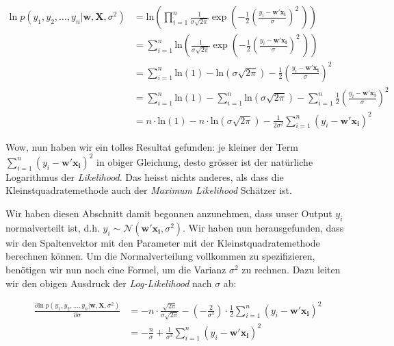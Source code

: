 \documentclass[
]{book}
\begin{document}
\begin{align}
\text{ln}\; p(y_1,y_2,\dots,y_n|\mathbf{w},\mathbf{X},\sigma^2) &= \text{ln}\left(\prod_{i=1}^n \frac{1}{\sigma\sqrt{2\pi}} \exp\left( -\frac{1}{2}\left(\frac{y_i - \mathbf{w}' \mathbf{x_i}}{\sigma}\right)^{\!2}\,\right)\right) \\
&= \sum_{i=1}^n \text{ln}\left(\frac{1}{\sigma\sqrt{2\pi}} \exp\left( -\frac{1}{2}\left(\frac{y_i - \mathbf{w}' \mathbf{x_i}}{\sigma}\right)^{\!2}\,\right) \right) \\
&= \sum_{i=1}^n \text{ln}\left(1\right) - \text{ln}\left(\sigma\sqrt{2\pi}\right) - \frac{1}{2}\left(\frac{y_i - \mathbf{w}' \mathbf{x_i}}{\sigma}\right)^{\!2} \\
&= \sum_{i=1}^n \text{ln}\left(1\right) - \sum_{i=1}^n \text{ln}\left(\sigma\sqrt{2\pi}\right) - \sum_{i=1}^n \frac{1}{2}\left(\frac{y_i - \mathbf{w}' \mathbf{x_i}}{\sigma}\right)^{\!2} \\
&= n \cdot \text{ln}\left(1\right) - n \cdot \text{ln}\left(\sigma\sqrt{2\pi}\right) - \frac{1}{2\sigma^2} \sum_{i=1}^n \left(y_i - \mathbf{w}' \mathbf{x_i}\right)^{\!2}
\end{align}

Wow, nun haben wir ein tolles Resultat gefunden: je kleiner der Term \(\sum_{i=1}^n \left(y_i - \mathbf{w}' \mathbf{x_i}\right)^{\!2}\) in obiger Gleichung, desto grösser ist der natürliche Logarithmus der \emph{Likelihood}. Das heisst nichts anderes, als dass die Kleinstquadratemethode auch der \emph{Maximum Likelihood} Schätzer ist.

Wir haben diesen Abschnitt damit begonnen anzunehmen, dass unser Output \(y_i\) normalverteilt ist, d.h. \(y_i \sim \mathcal{N}\left(\mathbf{w}' \mathbf{x_i}, \sigma^2\right)\). Wir haben nun herausgefunden, dass wir den Spaltenvektor mit den Parameter mit der Kleinstquadratemethode berechnen können. Um die Normalverteilung vollkommen zu spezifizieren, benötigen wir nun noch eine Formel, um die Varianz \(\sigma^2\) zu rechnen. Dazu leiten wir den obigen Ausdruck der \emph{Log-Likelihood} nach \(\sigma\) ab:

\begin{align}
\frac{\partial \text{ln}\; p(y_1,y_2,\dots,y_n|\mathbf{w},\mathbf{X},\sigma^2)}{\partial \sigma} &= -n\cdot \frac{\sqrt{2\pi}}{\sigma\sqrt{2\pi}} - (-\frac{2}{\sigma^3}) \cdot \frac{1}{2} \sum_{i=1}^n \left(y_i - \mathbf{w}' \mathbf{x_i}\right)^{\!2} \\
&= -\frac{n}{\sigma} + \frac{1}{\sigma^3} \sum_{i=1}^n \left(y_i - \mathbf{w}' \mathbf{x_i}\right)^{\!2}
\end{align}
\end{document}
